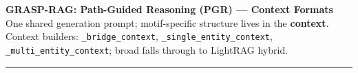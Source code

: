 \documentclass{article}
\newcommand{\fn}[1]{\texttt{\footnotesize\color{gray!70}#1}}
\begin{document}
{\centering
{\large\bfseries\sffamily GRASP-RAG: Path-Guided Reasoning (PGR) — Context Formats}\\[2pt]
{\small\sffamily\color{gray}
  One shared generation prompt; motif-specific structure lives in the \textbf{context}.
  Context builders: \fn{\_bridge\_context}, \fn{\_single\_entity\_context},
  \fn{\_multi\_entity\_context}; broad falls through to LightRAG hybrid.}
\par}

\vspace{6pt}
\noindent\rule{\linewidth}{0.5pt}
\vspace{4pt}

\end{document}
